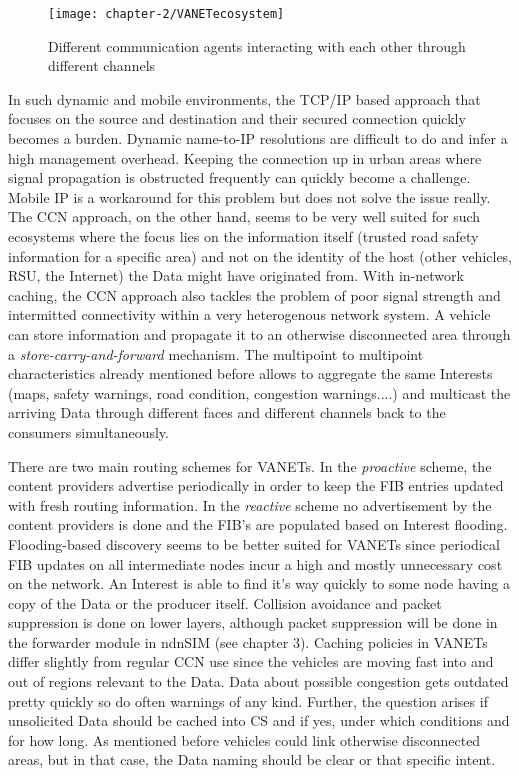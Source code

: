 \begin{figure}[H]
  \centering
  \texttt{[image: chapter-2/VANETecosystem]}
  \caption{Different communication agents interacting with each other through different channels}
  \label{fig:VANETecosystem}
\end{figure}

\vspace{5mm} %

In such dynamic and mobile environments, the TCP/IP based approach that focuses on the source and destination and their secured connection quickly becomes a burden. Dynamic name-to-IP resolutions are difficult to do and infer a high management overhead. Keeping the connection up in urban areas where signal propagation is obstructed frequently can quickly become a challenge. Mobile IP is a workaround for this problem but does not solve the issue really. The CCN approach, on the other hand, seems to be very well suited for such ecosystems where the focus lies on the information itself (trusted road safety information for a specific area) and not on the identity of the host (other vehicles, RSU, the Internet) the Data might have originated from. With in-network caching, the CCN approach also tackles the problem of poor signal strength and intermitted connectivity within a very heterogenous network system. A vehicle can store information and propagate it to an otherwise disconnected area through a \emph{store-carry-and-forward} mechanism. The multipoint to multipoint characteristics already mentioned before allows to aggregate the same Interests (maps, safety warnings, road condition, congestion warnings....) and multicast the arriving Data through different faces and different channels back to the consumers simultaneously.

\vspace{5mm} %

There are two main routing schemes for VANETs. In the \emph{proactive} scheme, the content providers advertise periodically in order to keep the FIB entries updated with fresh routing information. In the \emph{reactive} scheme no advertisement by the content providers is done and the FIB's are populated based on Interest flooding. Flooding-based discovery seems to be better suited for VANETs since periodical FIB updates on all intermediate nodes incur a high and mostly unnecessary cost on the network. An Interest is able to find it's way quickly to some node having a copy of the Data or the producer itself. Collision avoidance and packet suppression is done on lower layers, although packet suppression will be done in the forwarder module in ndnSIM (see chapter 3).
Caching policies in VANETs differ slightly from regular CCN use since the vehicles are moving fast into and out of regions relevant to the Data. Data about possible congestion gets outdated pretty quickly so do often warnings of any kind. Further, the question arises if unsolicited Data should be cached into CS and if yes, under which conditions and for how long. As mentioned before vehicles could link otherwise disconnected areas, but in that case, the Data naming should be clear or that specific intent.

